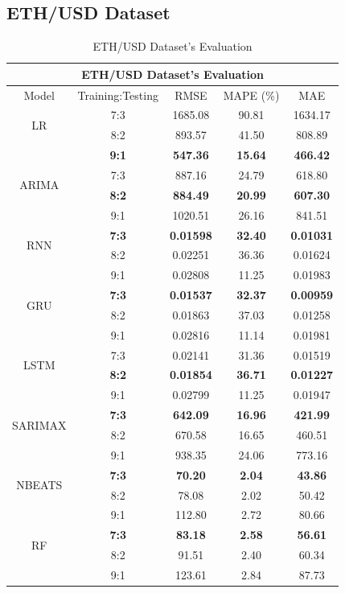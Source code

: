 \documentclass{ieeeojies}
\begin{document}
\subsection{ETH/USD Dataset}
\begin{table}[H]
	\centering
	\begin{tabular}{|c|c|c|c|c|}
		\hline
		\multicolumn{5}{|c|}{\textbf{ETH/USD Dataset's Evaluation}}\\
		\hline
		\centering Model & Training:Testing & RMSE & MAPE (\%) & MAE\\
		\hline
		\multirow{2}{*}{LR} & 7:3 & 1685.08 &  90.81 &  1634.17 \\ & 8:2 & 893.57 & 41.50 & 808.89 \\ & \textbf{9:1} & \textbf{547.36} & \textbf{15.64} & \textbf{466.42}\\
		\hline
		\multirow{2}{*}{ARIMA} & 7:3 & 887.16 & 24.79 & 618.80 \\ & \textbf{8:2} & \textbf{884.49}& \textbf{20.99} & \textbf{607.30} \\ & 9:1 & 1020.51 & 26.16 & 841.51\\
		\hline
		\multirow{2}{*}{RNN} & \textbf{7:3} & \textbf{0.01598} & \textbf{32.40} & \textbf{0.01031}\\ & 8:2& 0.02251 & 36.36 & 0.01624 \\ & 9:1 & 0.02808 & 11.25 & 0.01983\\
		\hline
		\multirow{2}{*}{GRU} & \textbf{7:3}	& \textbf{0.01537} & \textbf{32.37} &  \textbf{0.00959} \\ & 8:2 & 0.01863 & 37.03 & 0.01258 \\ & 9:1 & 0.02816  & 11.14 & 0.01981\\
		\hline
		\multirow{2}{*}{LSTM} & 7:3 &  0.02141 &  31.36 & 0.01519 \\ & \textbf{8:2} &  \textbf{0.01854} & \textbf{36.71} &  \textbf{0.01227} \\ & 9:1 & 0.02799  & 11.25 & 0.01947\\
		\hline
		\multirow{2}{*}{SARIMAX} & \textbf{7:3}	& \textbf{642.09} & \textbf{16.96} &  \textbf{421.99} \\ & 8:2 & 670.58 & 16.65 & 460.51 \\ & 9:1 & 938.35 &  24.06 & 773.16\\
		\hline
		\multirow{2}{*}{NBEATS} & \textbf{7:3} & \textbf{70.20} & \textbf{2.04} & \textbf{43.86} \\ & 8:2 & 78.08 & 2.02 & 50.42 \\ & 9:1 & 112.80	& 2.72 & 80.66 \\
		\hline
		\multirow{2}{*}{RF} & \textbf{7:3} & \textbf{83.18} & \textbf{2.58} & \textbf{56.61} \\ & 8:2 & 91.51 & 2.40 & 60.34 \\ & 9:1 & 123.61 & 2.84 & 87.73 \\
		\hline
	\end{tabular}
	\caption{ETH/USD Dataset's Evaluation}
	\label{ethresult}
\end{table}
\end{document}
